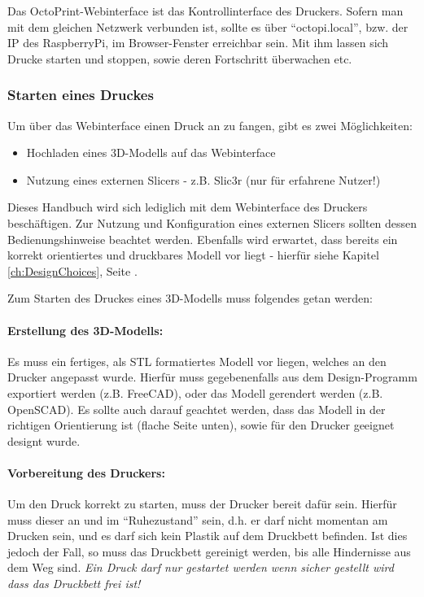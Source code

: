 Das OctoPrint-Webinterface ist das Kontrollinterface des Druckers. Sofern man mit dem gleichen Netzwerk verbunden ist, sollte es über "`octopi.local"', bzw. der IP des RaspberryPi, im Browser-Fenster erreichbar sein. Mit ihm lassen sich Drucke starten und stoppen, sowie deren Fortschritt überwachen etc.

\subsubsection{Starten eines Druckes}
Um über das Webinterface einen Druck an zu fangen, gibt es zwei Möglichkeiten:
\begin{itemize}[noitemsep]
\item Hochladen eines 3D-Modells auf das Webinterface
\item Nutzung eines externen Slicers - z.B. Slic3r (nur für erfahrene Nutzer!)
\end{itemize}
Dieses Handbuch wird sich lediglich mit dem Webinterface des Druckers beschäftigen. Zur Nutzung und Konfiguration eines externen Slicers sollten dessen Bedienungshinweise beachtet werden. Ebenfalls wird erwartet, dass bereits ein korrekt orientiertes und druckbares Modell vor liegt - hierfür siehe Kapitel \ref{ch:DesignChoices}, Seite \pageref{ch:DesignChoices}.

Zum Starten des Druckes eines 3D-Modells muss folgendes getan werden:

\paragraph{Erstellung des 3D-Modells:} Es muss ein fertiges, als STL formatiertes Modell vor liegen, welches an den Drucker angepasst wurde. Hierfür muss gegebenenfalls aus dem Design-Programm exportiert werden (z.B. FreeCAD), oder das Modell gerendert werden (z.B. OpenSCAD). Es sollte auch darauf geachtet werden, dass das Modell in der richtigen Orientierung ist (flache Seite unten), sowie für den Drucker geeignet designt wurde.

\paragraph{Vorbereitung des Druckers:} Um den Druck korrekt zu starten, muss der Drucker bereit dafür sein. Hierfür muss dieser an und im "`Ruhezustand"' sein, d.h. er darf nicht momentan am Drucken sein, und es darf sich kein Plastik auf dem Druckbett befinden. Ist dies jedoch der Fall, so muss das Druckbett gereinigt werden, bis alle Hindernisse aus dem Weg sind. \emph{Ein Druck darf nur gestartet werden wenn sicher gestellt wird dass das Druckbett frei ist!}


